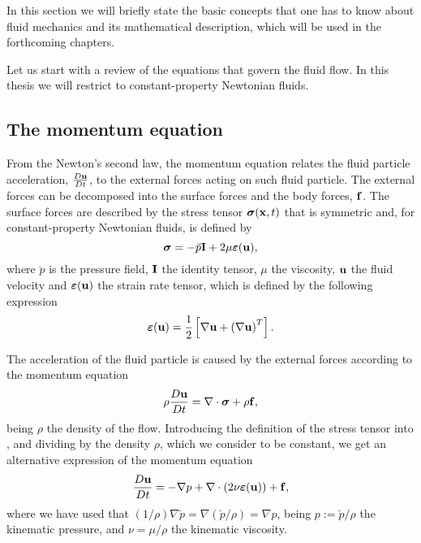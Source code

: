 In this section we will briefly state the basic concepts that one has to know about fluid mechanics and its mathematical description, which will be used in the forthcoming chapters.

Let us start with a review of the equations that govern the fluid flow. In this thesis we will restrict to constant-property Newtonian fluids. 

\subsection{The momentum equation}
\label{subsec-momentum}
From the Newton's second law, the momentum equation relates the fluid particle acceleration, $\frac{D{\bf u}}{Dt}$, to the external forces acting on such fluid particle. The external forces can be decomposed into the surface forces and the body forces, ${\bf f}$. The surface forces are described by the stress tensor $\boldsymbol{\sigma}({\bf x},t)$ that is symmetric and, for constant-property Newtonian fluids, is defined by
\begin{equation}
\label{eq-stress_tensor_def}
\boldsymbol{\sigma} = -\breve{p}\mathbf{I} + 2\mu\boldsymbol{\varepsilon}({\bf u}), 
\end{equation}
where $\breve{p}$ is the pressure field, $\mathbf{I}$ the identity tensor, $\mu$ the viscosity, $ {\bf u} $ the fluid velocity and $\boldsymbol{\varepsilon}({\bf u})$ the strain rate tensor, which is defined by the following expression
\begin{equation}
\label{eq-strain_tensor_def}
\boldsymbol{\varepsilon}({\bf u})=\frac{1}{2}\left[\nabla{\bf u}+\left(\nabla{\bf u}\right)^T\right].
\end{equation}

The acceleration of the fluid particle is caused by the external forces according to the momentum equation
\begin{equation}
\label{eq-momentum_equation_def1}
\rho\frac{D{\bf u}}{Dt}=\nabla\cdot\boldsymbol{\sigma}+\rho{\bf f},
\end{equation}
being $\rho$ the density of the flow. Introducing the definition of the stress tensor  into , and dividing by the density $\rho$, which we consider to be constant, we get an alternative expression of the momentum equation
\begin{equation}
\label{eq-momentum_equation_def2}
\frac{D{\bf u}}{Dt}=-\nabla p+\nabla\cdot(2\nu\boldsymbol{\varepsilon}({\bf u}))+{\bf f},
\end{equation}
where we have used that $(1/\rho)\nabla\breve{p}=\nabla(\breve{p}/\rho)=\nabla p$, being $p:=\breve{p}/\rho$ the kinematic pressure, and $\nu=\mu/\rho$ the kinematic viscosity.

